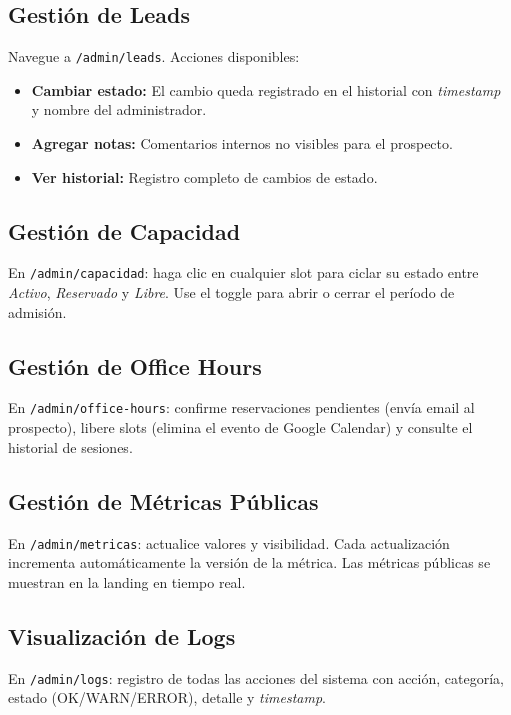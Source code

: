 \documentclass[12pt, a4paper, twoside]{report}
\begin{document}
\subsection{Gestión de Leads}

Navegue a \texttt{/admin/leads}. Acciones disponibles:

\begin{itemize}
  \item \textbf{Cambiar estado:} El cambio queda registrado en el historial con
        \textit{timestamp} y nombre del administrador.
  \item \textbf{Agregar notas:} Comentarios internos no visibles para el prospecto.
  \item \textbf{Ver historial:} Registro completo de cambios de estado.
\end{itemize}

\subsection{Gestión de Capacidad}

En \texttt{/admin/capacidad}: haga clic en cualquier slot para ciclar su estado entre
\textit{Activo}, \textit{Reservado} y \textit{Libre}. Use el toggle para abrir o cerrar
el período de admisión.

\subsection{Gestión de Office Hours}

En \texttt{/admin/office-hours}: confirme reservaciones pendientes (envía email al
prospecto), libere slots (elimina el evento de Google Calendar) y consulte el historial
de sesiones.

\subsection{Gestión de Métricas Públicas}

En \texttt{/admin/metricas}: actualice valores y visibilidad. Cada actualización incrementa
automáticamente la versión de la métrica. Las métricas públicas se muestran en la landing
en tiempo real.

\subsection{Visualización de Logs}

En \texttt{/admin/logs}: registro de todas las acciones del sistema con acción, categoría,
estado (OK/WARN/ERROR), detalle y \textit{timestamp}.
\end{document}
